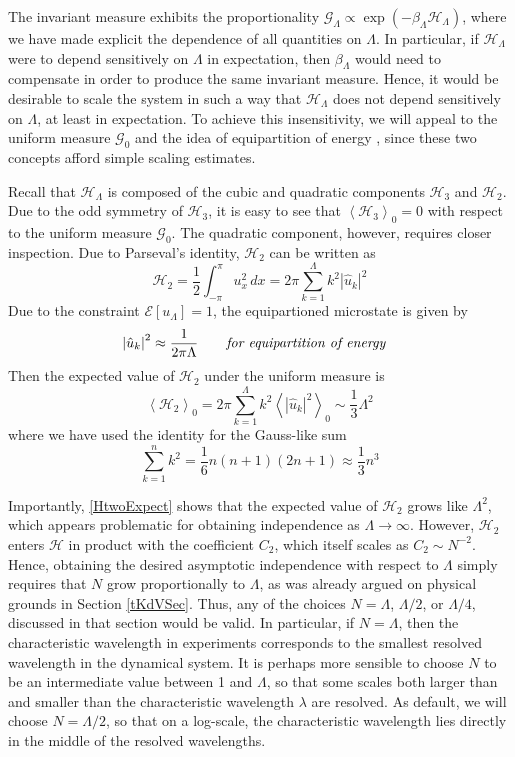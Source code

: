 \documentclass[11pt]{article}
\newcommand{\abs}[1]{\left| #1 \right|}
\newcommand{\mean}[1]{\left< #1 \right>}
\newcommand{\dx}{\, dx}
\newcommand{\lam}{\lambda}
\newcommand{\lamfac}{N}
\newcommand{\En}{\mathcal{E}}
\newcommand{\uhat}{\hat{u}}
\newcommand{\Ham}{\mathcal{H}}
\newcommand{\Hthree}{\Ham_{3}}
\newcommand{\Htwo}{\Ham_{2}}
\newcommand{\uL}{u_{\Lambda}}
\newcommand{\Gibbs}{\mathcal{G}}
\newcommand{\invtemp}{\beta}
\newcommand{\Gz}{\Gibbs_0}
\newcommand{\meanz}[1]{\mean{#1}_0}
\begin{document}
	The invariant measure exhibits the proportionality $ \Gibbs_{\Lambda} \propto \exp(-\invtemp_{\Lambda} \Ham_{\Lambda})$, where we have made explicit the dependence of all quantities on $\Lambda$. In particular, if $\Ham_{\Lambda}$ were to depend sensitively on $\Lambda$ in expectation, then $\invtemp_{\Lambda}$ would need to compensate in order to produce the same invariant measure. Hence, it would be desirable to scale the system in such a way that $\Ham_{\Lambda}$ does not depend sensitively on $\Lambda$, at least in expectation. 
To achieve this insensitivity, we will appeal to the uniform measure $\Gz$ and the idea of equipartition of energy \cite{abramov2003}, since these two concepts afford simple scaling estimates.

Recall that $\Ham_{\Lambda}$ is composed of the cubic and quadratic components $\Hthree$ and $\Htwo$. Due to the odd symmetry of $\Hthree$, it is easy to see that $\meanz{\Hthree} = 0$ with respect to the uniform measure $\Gz$. The quadratic component, however, requires closer inspection. Due to Parseval's identity, $\Htwo$ can be written as
\begin{equation}
\Htwo = \frac{1}{2} \int_{-\pi}^{\pi} u_x^2 \dx = 2 \pi \sum_{k=1}^{\Lambda} k^2 \abs{\uhat_k}^2
\end{equation}
Due to the constraint $\En[\uL] = 1$, the equipartioned microstate is given by 
\begin{align}
&\abs{\uhat_k}^2 \approx \frac{1}{2 \pi \Lambda}	 \qquad \mbox{\em for equipartition of energy}
\end{align}
Then the expected value of $\Htwo$ under the uniform measure is
\begin{equation}
\label{HtwoExpect}
\mean{\Htwo}_0 = 2 \pi \sum_{k=1}^{\Lambda} {k}^ 2 \mean{\abs{\uhat_k}^2}_0 \sim \frac{1}{3} \Lambda^2
\end{equation}
where we have used the identity for the Gauss-like sum
\begin{equation}
\sum_{k=1}^{n} {k}^ 2 = \frac{1}{6} n(n+1)(2n+1) \approx \frac{1}{3} n^3
\end{equation}

	Importantly, \eqref{HtwoExpect} shows that the expected value of $\Htwo$ grows like $\Lambda^2$, which appears problematic for obtaining independence as $\Lambda \to \infty$. However, $\Htwo$ enters $\Ham$ in product with the coefficient $C_2$, which itself scales as $C_2 \sim \lamfac^{-2}$. Hence, obtaining the desired asymptotic independence with respect to $\Lambda$ simply requires that $\lamfac$ grow proportionally to $\Lambda$, as was already argued on physical grounds in Section \ref{tKdVSec}. 
Thus, any of the choices $\lamfac = \Lambda$, $\Lambda/2$, or $\Lambda/4$, discussed in that section would be valid. In particular, if $\lamfac = \Lambda$, then the characteristic wavelength in experiments corresponds to the smallest resolved wavelength in the dynamical system. It is perhaps more sensible to choose $\lamfac$ to be an intermediate value between 1 and $\Lambda$, so that some scales both larger than and smaller than the characteristic wavelength $\lam$ are resolved. As default, we will choose $\lamfac = \Lambda/2$, so that on a log-scale, the characteristic wavelength lies directly in the middle of the resolved wavelengths. 
\end{document}
